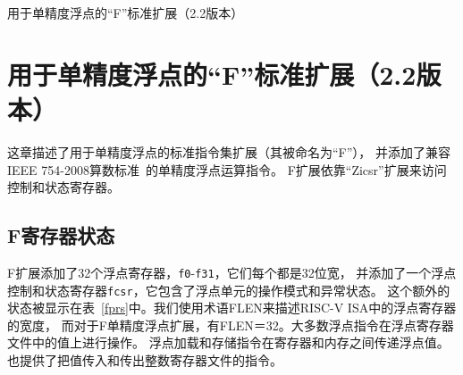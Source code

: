 用于单精度浮点的“F”标准扩展（2.2版本）
\chapter{用于单精度浮点的“F”标准扩展（2.2版本）}
\label{sec:single-float}

这章描述了用于单精度浮点的标准指令集扩展（其被命名为“F”），
并添加了兼容IEEE 754-2008算数标准~\cite{ieee754-2008}的单精度浮点运算指令。
F扩展依靠“Zicsr”扩展来访问控制和状态寄存器。

\section{F寄存器状态}

F扩展添加了32个浮点寄存器，{\tt f0}-{\tt f31}，它们每个都是32位宽，
并添加了一个浮点控制和状态寄存器{\tt fcsr}，它包含了浮点单元的操作模式和异常状态。
这个额外的状态被显示在表~\ref{fprs}中。我们使用术语FLEN来描述RISC-V ISA中的浮点寄存器的宽度，
而对于F单精度浮点扩展，有FLEN＝32。大多数浮点指令在浮点寄存器文件中的值上进行操作。
浮点加载和存储指令在寄存器和内存之间传递浮点值。也提供了把值传入和传出整数寄存器文件的指令。

